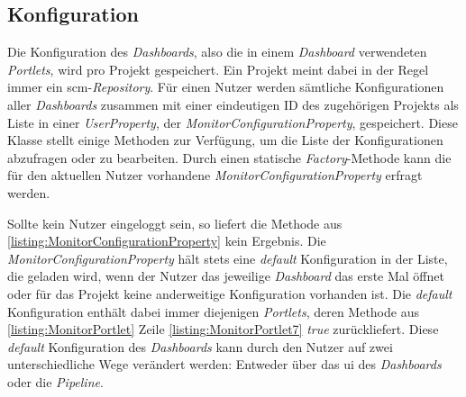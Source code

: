 \subsection{Konfiguration}
Die Konfiguration des \textit{Dashboards}, also die in einem \textit{Dashboard} verwendeten \textit{Portlets}, wird pro Projekt gespeichert. Ein Projekt meint dabei in der Regel immer ein \ac{scm}-\textit{Repository}. Für einen Nutzer werden sämtliche Konfigurationen aller \textit{Dashboards} zusammen mit einer eindeutigen ID des zugehörigen Projekts als Liste in einer \textit{UserProperty}, der \textit{MonitorConfigurationProperty}, gespeichert. Diese Klasse stellt einige Methoden zur Verfügung, um die Liste der Konfigurationen abzufragen oder zu bearbeiten. Durch einen statische \textit{Factory}-Methode \citep{gamma_helm_johnson_1998} kann die für den aktuellen Nutzer vorhandene \textit{MonitorConfigurationProperty} erfragt werden.



Sollte kein Nutzer eingeloggt sein, so liefert die Methode aus \autoref{listing:MonitorConfigurationProperty} kein Ergebnis. Die \textit{MonitorConfigurationProperty} hält stets eine \textit{default} Konfiguration in der Liste, die geladen wird, wenn der Nutzer das jeweilige \textit{Dashboard} das erste Mal öffnet oder für das Projekt keine anderweitige Konfiguration vorhanden ist. Die \textit{default} Konfiguration enthält dabei immer diejenigen \textit{Portlets}, deren Methode aus \autoref{listing:MonitorPortlet} Zeile \autoref{listing:MonitorPortlet7} \textit{true} zurückliefert. Diese \textit{default} Konfiguration des \textit{Dashboards} kann durch den Nutzer auf zwei unterschiedliche Wege verändert werden: Entweder über das \ac{ui} des \textit{Dashboards} oder die \textit{Pipeline}.

